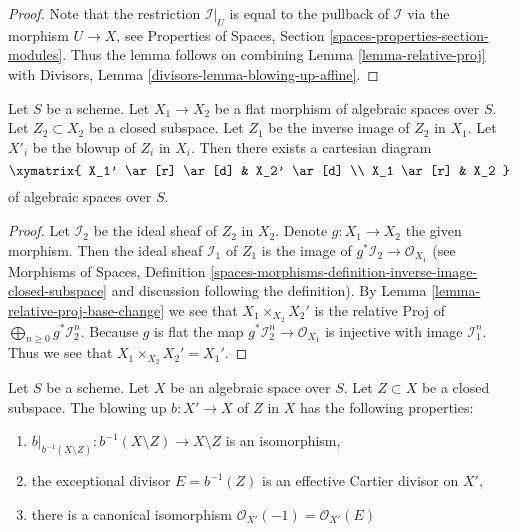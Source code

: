 \begin{proof}
Note that the restriction $\mathcal{I}|_U$ is equal to the pullback
of $\mathcal{I}$ via the morphism $U \to X$, see
Properties of Spaces, Section \ref{spaces-properties-section-modules}.
Thus the lemma follows on combining Lemma \ref{lemma-relative-proj} with
Divisors, Lemma \ref{divisors-lemma-blowing-up-affine}.
\end{proof}

\begin{lemma}
\label{lemma-flat-base-change-blowing-up}
Let $S$ be a scheme.
Let $X_1 \to X_2$ be a flat morphism of algebraic spaces over $S$.
Let $Z_2 \subset X_2$ be a closed subspace.
Let $Z_1$ be the inverse image of $Z_2$ in $X_1$.
Let $X'_i$ be the blowup of $Z_i$ in $X_i$. Then there exists a cartesian
diagram
$$
\xymatrix{
X_1' \ar[r] \ar[d] & X_2' \ar[d] \\
X_1 \ar[r] & X_2
}
$$
of algebraic spaces over $S$.
\end{lemma}

\begin{proof}
Let $\mathcal{I}_2$ be the ideal sheaf of $Z_2$ in $X_2$.
Denote $g : X_1 \to X_2$ the given morphism. Then the ideal sheaf
$\mathcal{I}_1$ of $Z_1$ is the image of
$g^*\mathcal{I}_2 \to \mathcal{O}_{X_1}$
(see Morphisms of Spaces, Definition
\ref{spaces-morphisms-definition-inverse-image-closed-subspace}
and discussion following the definition).
By Lemma \ref{lemma-relative-proj-base-change}
we see that $X_1 \times_{X_2} X_2'$ is the relative Proj of
$\bigoplus_{n \geq 0} g^*\mathcal{I}_2^n$. Because $g$ is flat the map
$g^*\mathcal{I}_2^n \to \mathcal{O}_{X_1}$ is injective with image
$\mathcal{I}_1^n$. Thus we see that $X_1 \times_{X_2} X_2' = X_1'$.
\end{proof}

\begin{lemma}
\label{lemma-blowing-up-gives-effective-Cartier-divisor}
Let $S$ be a scheme. Let $X$ be an algebraic space over $S$.
Let $Z \subset X$ be a closed subspace.
The blowing up $b : X' \to X$ of $Z$ in $X$
has the following properties:
\begin{enumerate}
\item $b|_{b^{-1}(X \setminus Z)} : b^{-1}(X \setminus Z) \to X \setminus Z$
is an isomorphism,
\item the exceptional divisor $E = b^{-1}(Z)$ is an effective Cartier divisor
on $X'$,
\item there is a canonical isomorphism
$\mathcal{O}_{X'}(-1) = \mathcal{O}_{X'}(E)$
\end{enumerate}
\end{lemma}

